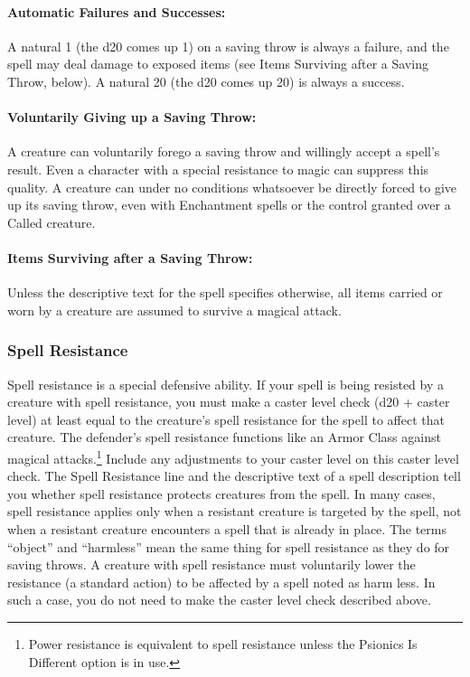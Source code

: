 \paragraph{Automatic Failures and Successes:} A natural 1 (the d20 comes up 1) on a saving throw is always a failure, and the spell may deal damage to exposed items (see Items Surviving after a Saving Throw, below). A natural 20 (the d20 comes up 20) is always a success.

\paragraph{Voluntarily Giving up a Saving Throw:} A creature can voluntarily forego a saving throw and willingly accept a spell's result. Even a character with a special resistance to magic can suppress this quality.
A creature  can under no conditions whatsoever be directly forced to give up its saving throw, even with Enchantment spells or the control granted over a Called creature.

\paragraph{Items Surviving after a Saving Throw:} Unless the descriptive text for the spell specifies otherwise, all items carried or worn by a creature are assumed to survive a magical attack.

\subsubsection{Spell Resistance}
Spell resistance is a special defensive ability. If your spell is being resisted by a creature with spell resistance, you must make a caster level check (d20 + caster level) at least equal to the creature's spell resistance for the spell to affect that creature. The defender's spell resistance functions like an Armor Class against magical attacks.\footnote{Power resistance is equivalent to spell resistance unless the Psionics Is Different option is in use.} Include any adjustments to your caster level on this caster level check.
The Spell Resistance line and the descriptive text of a spell description tell you whether spell resistance protects creatures from the spell. In many cases, spell resistance applies only when a resistant creature is targeted by the spell, not when a resistant creature encounters a spell that is already in place.
The terms “object” and “harmless” mean the same thing for spell resistance as they do for saving throws. A creature with spell resistance must voluntarily lower the resistance (a standard action) to be affected by a spell noted as harm less. In such a case, you do not need to make the caster level check described above.

